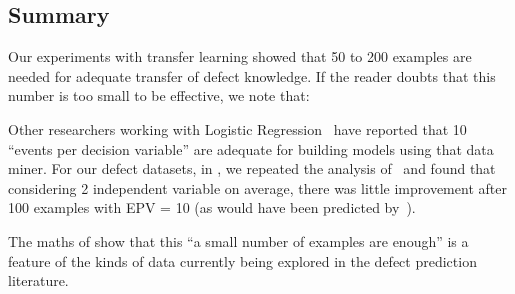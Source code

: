 \subsection{Summary}
Our experiments with transfer learning showed that 50 to 200 examples are needed for adequate
transfer of defect knowledge. If the reader doubts that this number is too small to be effective,
we note that:
\squishlist
\item Other researchers working with Logistic Regression~\cite{peduzzi1996simulation}
have reported that 10 ``events per decision variable'' are adequate for building models using that
data miner. For our defect datasets, in , we repeated the analysis of~\cite{peduzzi1996simulation}
and found that considering 2 independent variable on average, there was little improvement after 100 examples with EPV = 10 (as would have been predicted by~\cite{peduzzi1996simulation}).
\item The maths of  show that this ``a small number of examples are enough'' is a feature of the kinds of
data currently being explored in the defect prediction
literature.
\squishend
